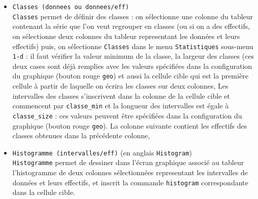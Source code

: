 \documentclass[a4paper,11pt]{book}
\begin{document}
\begin{itemize}
\item {\tt Classes (donnees ou donnees/eff)}\\
{\tt Classes}  permet de d\'efinir des classes : on s\'electionne une 
colonne du tableur contenant la s\'erie que l'on veut regrouper en classes (ou 
si on a des effectifs, on s\'electionne deux colonnes du tableur representant 
les donn\'ees et leurs effectifs) puis, on s\'electionne {\tt Classes} dans le 
menu {\tt Statistiques} sous-menu {\tt 1-d} : il faut v\'erifier la valeur 
minimum de la classe, la largeur des classes (ces deux cases sont d\'ej\`a 
remplies avec les valeurs sp\'ecifi\'ees dans la configuration du graphique 
(bouton rouge {\tt geo}) et aussi la cellule cible qui est la 
premi\`ere cellule \`a partir de laquelle on \'ecrira les classes sur deux 
colonnes,
Les intervalles des classes s'inscrivent dans la colonne de la cellule cible 
et commencent par {\tt classe\_min} et la longueur des
 intervalles est \'egale \`a {\tt classe\_size} : ces valeurs peuvent \^etre  
sp\'ecifi\'ees dans la configuration du graphique (bouton rouge {\tt geo}). 
La colonne suivante contient les effectifs des classes obtenues dans la  
pr\'ec\'edente colonne,
\item {\tt Histogramme (intervalles/eff)} (en anglais {\tt Histogram})\\
{\tt Histogramme} permet de dessiner dans l'\'ecran 
graphique associ\'e au tableur l'histogramme de deux colonnes s\'electionn\'ees
representant les intervalles de donn\'ees et leurs effectifs, et
inscrit la commande {\tt histogram} correspondante dans la cellule cible.
\end{itemize}
\end{document}
